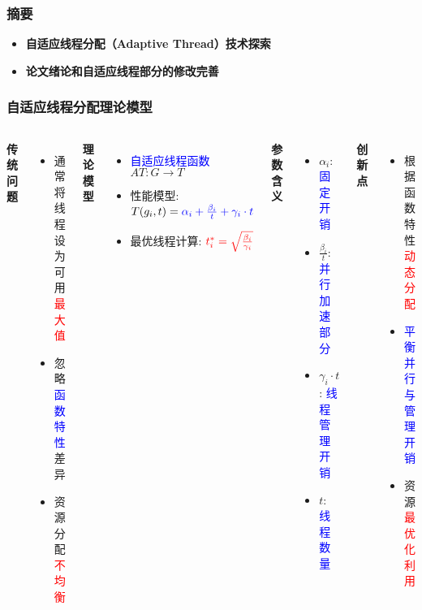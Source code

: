 \documentclass[slide]{../../custom}
\begin{document}
\begin{frame}
  \titlepage
\end{frame}

\begin{frame}
  \frametitle{摘要}
  \begin{itemize}
    \item \textbf{自适应线程分配（Adaptive Thread）技术探索}
    \item \textbf{论文绪论和自适应线程部分的修改完善}
  \end{itemize}
\end{frame}

\begin{frame}
  \frametitle{自适应线程分配理论模型}
  \begin{columns}
    \textbf{传统问题}
    \begin{itemize}
      \item 通常将线程设为可用\textcolor{red}{最大值}
      \item 忽略\textcolor{blue}{函数特性}差异
      \item 资源分配\textcolor{red}{不均衡}
    \end{itemize}

    \textbf{理论模型}
    \begin{itemize}
      \item \textcolor{blue}{自适应线程函数}$AT:G\rightarrow T$
      \item 性能模型: $T(g_i, t) = \textcolor{blue}{\alpha_i + \frac{\beta_i}{t} + \gamma_i \cdot t}$
      \item 最优线程计算: $\textcolor{red}{t_i^* = \sqrt{\frac{\beta_i}{\gamma_i}}}$
    \end{itemize}

    \textbf{参数含义}
    \begin{itemize}
      \item $\alpha_i$: \textcolor{blue}{固定开销}
      \item $\frac{\beta_i}{t}$: \textcolor{blue}{并行加速部分}
      \item $\gamma_i \cdot t$: \textcolor{blue}{线程管理开销}
      \item $t$: \textcolor{blue}{线程数量}
    \end{itemize}

    \textbf{创新点}
    \begin{itemize}
      \item 根据函数特性\textcolor{red}{动态分配}
      \item \textcolor{blue}{平衡并行与管理开销}
      \item 资源\textcolor{red}{最优化利用}
    \end{itemize}
  \end{columns}
\end{frame}
\end{document}
